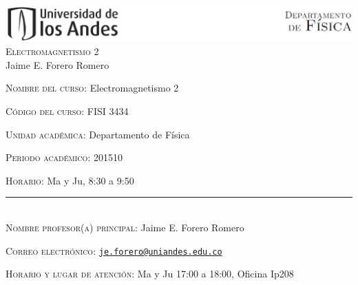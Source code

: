 \documentclass[letterpaper,10pt,onecolumn]{article}
\begin{document}
\begin{center}

\includegraphics[width=490pt]{header.png}\\[0.5cm]

\textsc{\LARGE Electromagnetismo 2}\\[0.1cm]

\large Jaime E. Forero Romero\\[0.5cm]

\end{center}

\large \noindent\textsc{Nombre del curso:}  Electromagnetismo 2%
 
\noindent\textsc{C\'odigo del curso:} FISI 3434 %

\noindent\textsc{Unidad acad\'emica:} Departamento de F\'isica

\noindent\textsc{Periodo acad\'emico:} 201510 %

\noindent\textsc{Horario:} Ma y Ju, 8:30 a 9:50%

\noindent\rule{\textwidth}{1pt}\\[-0.3cm]

\normalsize \noindent\textsc{Nombre profesor(a) principal:} Jaime E. Forero Romero%

\noindent\textsc{Correo electr\'onico:} \href{mailto:je.forero@uniandes.edu.co}{\nolinkurl{je.forero@uniandes.edu.co}} %

\noindent\textsc{Horario y lugar de atenci\'on:} Ma y Ju 17:00 a
18:00, Oficina Ip208 %



\end{document}
